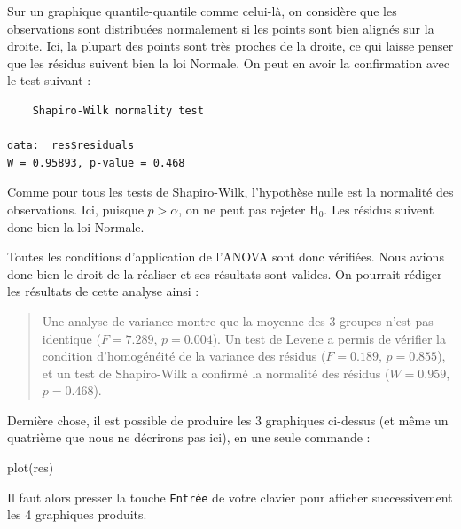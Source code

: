 \documentclass[
  a4paper,
]{article}
\newenvironment{Shaded}{\begin{snugshade}}{\end{snugshade}}
\newcommand{\FunctionTok}[1]{\textcolor[rgb]{0.39,0.29,0.61}{#1}}
\newcommand{\NormalTok}[1]{\textcolor[rgb]{0.12,0.11,0.11}{#1}}
\newcommand{\SpecialCharTok}[1]{\textcolor[rgb]{0.24,0.68,0.91}{#1}}
\begin{document}
Sur un graphique quantile-quantile comme celui-là, on considère que les observations sont distribuées normalement si les points sont bien alignés sur la droite. Ici, la plupart des points sont très proches de la droite, ce qui laisse penser que les résidus suivent bien la loi Normale. On peut en avoir la confirmation avec le test suivant :

\begin{Shaded}
\end{Shaded}

\begin{verbatim}
    Shapiro-Wilk normality test

data:  res$residuals
W = 0.95893, p-value = 0.468
\end{verbatim}

Comme pour tous les tests de Shapiro-Wilk, l'hypothèse nulle est la normalité des observations. Ici, puisque \(p > \alpha\), on ne peut pas rejeter H\(_0\). Les résidus suivent donc bien la loi Normale.

Toutes les conditions d'application de l'ANOVA sont donc vérifiées. Nous avions donc bien le droit de la réaliser et ses résultats sont valides. On pourrait rédiger les résultats de cette analyse ainsi :

\begin{quote}
Une analyse de variance montre que la moyenne des 3 groupes n'est pas identique (\(F = 7.289\), \(p = 0.004\)). Un test de Levene a permis de vérifier la condition d'homogénéité de la variance des résidus (\(F = 0.189\), \(p = 0.855\)), et un test de Shapiro-Wilk a confirmé la normalité des résidus (\(W = 0.959\), \(p = 0.468\)).
\end{quote}

Dernière chose, il est possible de produire les 3 graphiques ci-dessus (et même un quatrième que nous ne décrirons pas ici), en une seule commande :

\begin{Shaded}
\begin{Highlighting}[]
\FunctionTok{plot}\NormalTok{(res)}
\end{Highlighting}
\end{Shaded}

Il faut alors presser la touche \texttt{Entrée} de votre clavier pour afficher successivement les 4 graphiques produits.
\end{document}
